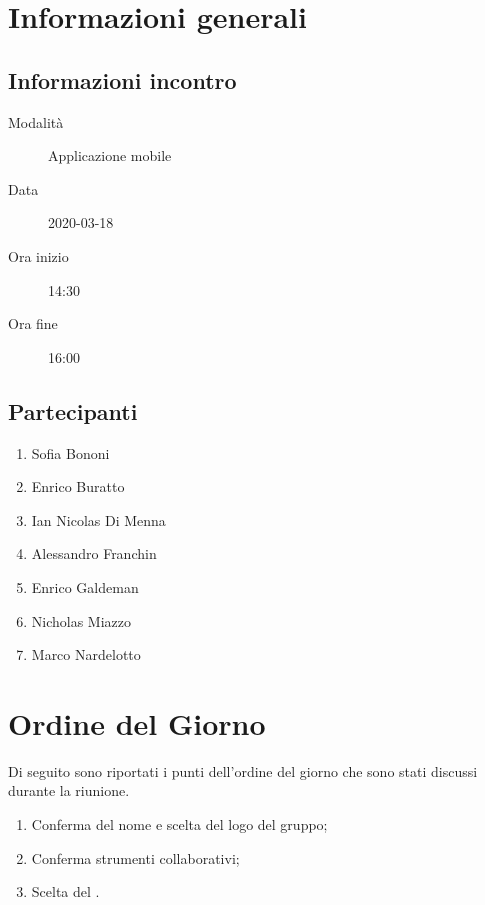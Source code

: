 \documentclass{article}
\begin{document}


\section{Informazioni generali}%
\label{sec:informazioni_generali}

\subsection{Informazioni incontro}%
\label{sub:informazioni_incontro}

\begin{description}
  \item[Modalità] Applicazione mobile 
  \item[Data] 2020-03-18
  \item[Ora inizio] 14:30
  \item[Ora fine] 16:00
\end{description}

\subsection{Partecipanti}%
\label{sub:partecipanti}

\begin{enumerate}
  \item Sofia Bononi
  \item Enrico Buratto
  \item Ian Nicolas Di Menna
  \item Alessandro Franchin
  \item Enrico Galdeman
  \item Nicholas Miazzo
  \item Marco Nardelotto
\end{enumerate}

\section{Ordine del Giorno}%
\label{ordine_del_giorno}
Di seguito sono riportati i punti dell'ordine del giorno che sono stati discussi durante la riunione.
\begin{enumerate}
  \item Conferma del nome e scelta del logo del gruppo;
  \item Conferma strumenti collaborativi;
  \item Scelta del .
\end{enumerate}
\end{document}
